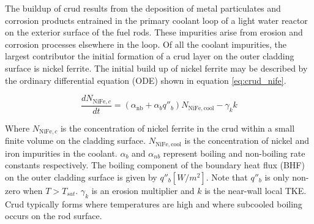 The buildup of crud results from the deposition of metal particulates and corrosion products entrained in the primary coolant loop of a light water reactor on the exterior surface of the fuel rods.  These impurities arise from erosion and corrosion processes elsewhere in the loop.  Of all the coolant impurities, the largest contributor the initial formation of a crud layer on the outer cladding surface is nickel ferrite.  The initial build up of nickel ferrite may be described by the ordinary differential equation (ODE) shown in equation \ref{eq:crud_nife}.

\begin{equation}
\frac{d N_{\mathrm{NiFe},c}}{dt} = (\alpha_{\mathrm{nb}} + \alpha_{b}q''_{b} )N_{\mathrm{NiFe}, \mathrm{cool}} - \gamma_k k
\label{eq:crud_nife}
\end{equation}

Where $N_{\mathrm{NiFe},c}$ is the concentration of nickel ferrite in the crud within a small finite volume on the cladding surface.  $N_{\mathrm{NiFe}, \mathrm{cool}}$ is the concentration of nickel and iron impurities in the coolant.  $\alpha_b$ and $\alpha_{nb}$ represent boiling and non-boiling rate constants respectively.  The boiling component of the boundary heat flux (BHF) on the outer cladding surface is given by $q''_b [W/m^2]$. Note that  $q''_b$ is only non-zero when $T>T_{sat}$. $\gamma_k$ is an erosion multiplier and $k$ is the near-wall local TKE.  Crud typically forms where temperatures are high and where subcooled boiling occurs on the rod surface.
